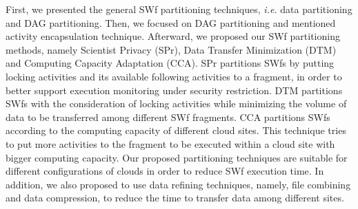 First, we presented the general SWf partitioning techniques, \textit{i.e.} data partitioning and DAG partitioning. Then, we focused on DAG partitioning and mentioned activity encapsulation technique. Afterward, we proposed our SWf partitioning methods, namely Scientist Privacy (SPr), Data Transfer Minimization (DTM) and Computing Capacity Adaptation (CCA). SPr partitions SWfs by putting locking activities and its available following activities to a fragment, in order to better support execution monitoring under security restriction. DTM partitions SWfs with the consideration of locking activities while minimizing the volume of data to be transferred among different SWf fragments. CCA partitions SWfs according to the computing capacity of different cloud sites. This technique tries to put more activities to the fragment to be executed within a cloud site with bigger computing capacity. 
Our proposed partitioning techniques are suitable for different configurations of clouds in order to reduce SWf execution time. In addition, we also proposed to use data refining techniques, namely, file combining and data compression, to reduce the time to transfer data among different sites.


